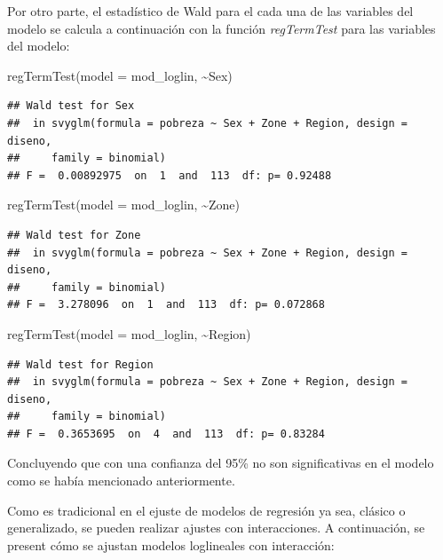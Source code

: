 \documentclass[
  12pt,
]{book}
\newenvironment{Shaded}{\begin{snugshade}}{\end{snugshade}}
\newcommand{\AttributeTok}[1]{\textcolor[rgb]{0.77,0.63,0.00}{#1}}
\newcommand{\FunctionTok}[1]{\textcolor[rgb]{0.00,0.00,0.00}{#1}}
\newcommand{\NormalTok}[1]{#1}
\newcommand{\SpecialCharTok}[1]{\textcolor[rgb]{0.00,0.00,0.00}{#1}}
\begin{document}
Por otro parte, el estadístico de Wald para el cada una de las variables del modelo se calcula a continuación con la función \emph{regTermTest} para las variables del modelo:

\begin{Shaded}
\begin{Highlighting}[]
  \FunctionTok{regTermTest}\NormalTok{(}\AttributeTok{model =}\NormalTok{ mod\_loglin, }\SpecialCharTok{\textasciitilde{}}\NormalTok{Sex)}
\end{Highlighting}
\end{Shaded}

\begin{verbatim}
## Wald test for Sex
##  in svyglm(formula = pobreza ~ Sex + Zone + Region, design = diseno, 
##     family = binomial)
## F =  0.00892975  on  1  and  113  df: p= 0.92488
\end{verbatim}

\begin{Shaded}
\begin{Highlighting}[]
  \FunctionTok{regTermTest}\NormalTok{(}\AttributeTok{model =}\NormalTok{ mod\_loglin, }\SpecialCharTok{\textasciitilde{}}\NormalTok{Zone)}
\end{Highlighting}
\end{Shaded}

\begin{verbatim}
## Wald test for Zone
##  in svyglm(formula = pobreza ~ Sex + Zone + Region, design = diseno, 
##     family = binomial)
## F =  3.278096  on  1  and  113  df: p= 0.072868
\end{verbatim}

\begin{Shaded}
\begin{Highlighting}[]
  \FunctionTok{regTermTest}\NormalTok{(}\AttributeTok{model =}\NormalTok{ mod\_loglin, }\SpecialCharTok{\textasciitilde{}}\NormalTok{Region)}
\end{Highlighting}
\end{Shaded}

\begin{verbatim}
## Wald test for Region
##  in svyglm(formula = pobreza ~ Sex + Zone + Region, design = diseno, 
##     family = binomial)
## F =  0.3653695  on  4  and  113  df: p= 0.83284
\end{verbatim}

Concluyendo que con una confianza del 95\% no son significativas en el modelo como se había mencionado anteriormente.

Como es tradicional en el ejuste de modelos de regresión ya sea, clásico o generalizado, se pueden realizar ajustes con interacciones. A continuación, se present cómo se ajustan modelos loglineales con interacción:
\end{document}
